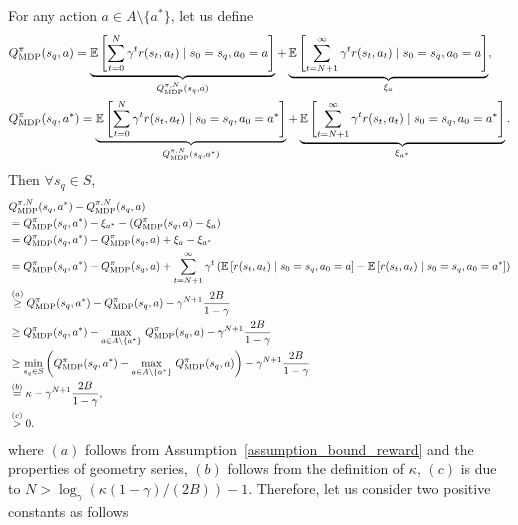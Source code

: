 \begin{myproof}
%   
For any action $a \in A \setminus \{a^*\} $, let us define
\begin{align}
    &Q_\text{MDP}^\pi(s_q, a) = \underbrace{{\mathbb E} \left[ \sum_{t=0}^{N} \gamma^t r(s_t, a_t) \mid s_0=s_q, a_0=a \right] }_{Q_\text{MDP}^{\pi, N}(s_q, a)} + \underbrace{ {\mathbb E} \left[ \sum_{t=N+1}^{\infty} \gamma^t r(s_t, a_t) \mid s_0=s_q, a_0=a \right] }_{\xi_a},  \\
    &Q_\text{MDP}^\pi(s_q, a^*) = \underbrace{{\mathbb E} \left[ \sum_{t=0}^{N} \gamma^t r(s_t, a_t) \mid s_0=s_q, a_0=a^* \right] }_{Q_\text{MDP}^{\pi, N}(s_q, a^*)} + \underbrace{ {\mathbb E} \left[ \sum_{t=N+1}^{\infty} \gamma^t r(s_t, a_t) \mid s_0=s_q, a_0=a^* \right] }_{\xi_{a^*}}.
\end{align}
%
%
Then $\forall s_q \in S$,
\begin{align}
    &Q_\text{MDP}^{\pi, N}(s_q, a^*) - Q_\text{MDP}^{\pi, N}(s_q, a) \\
    &= Q_\text{MDP}^\pi(s_q, a^*) - \xi_{a^*} - \left(Q_\text{MDP}^\pi(s_q, a) - \xi_{a} \right) \\
    &= Q_\text{MDP}^\pi(s_q, a^*) - Q_\text{MDP}^\pi(s_q, a) + \xi_{a} - \xi_{a^*} \\
    &= Q_\text{MDP}^\pi(s_q, a^*) - Q_\text{MDP}^\pi(s_q, a) + \sum_{t=N+1}^{\infty} \gamma^t \left({\mathbb E} \left[r(s_t, a_t) \mid s_0=s_q, a_0=a \right] - {\mathbb E} \left[r(s_t, a_t) \mid s_0=s_q, a_0=a^* \right] \right) \\
    &\stackrel{(a)}{\geq} Q_\text{MDP}^\pi(s_q, a^*) - Q_\text{MDP}^\pi(s_q, a)  - \gamma^{N+1} \frac{2B}{1-\gamma} \\
    &\geq Q_\text{MDP}^\pi(s_q, a^*) - \max_{a \in A \setminus \{a^*\}} \, Q_\text{MDP}^\pi(s_q, a)  - \gamma^{N+1} \frac{2B}{1-\gamma} \\
    &\geq \min\limits_{s_q \in S} \left( Q_\text{MDP}^\pi(s_q, a^*) - \max_{a \in A \setminus \{a^*\}} \, Q_\text{MDP}^\pi(s_q, a) \right)  - \gamma^{N+1} \frac{2B}{1-\gamma} \\
    &\stackrel{(b)}{=}  \kappa - \gamma^{N+1} \frac{2B}{1-\gamma}, \\
    &\stackrel{(c)}{>} 0.
\end{align}
%
where $(a)$ follows from Assumption~\ref{assumption_bound_reward} and the properties of geometry series, $(b)$ follows from the definition of $\kappa$, $(c)$ is due to $N > \log_\gamma \left( \kappa (1-\gamma)/(2B) \right)-1$.
%
%
Therefore, let us consider two positive constants as follows
\begin{align}

\end{align}
\end{myproof}
